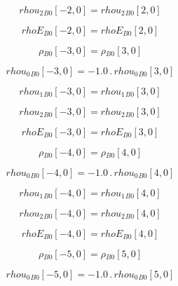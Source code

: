\documentclass{article}
\begin{document}
\begin{dmath}{rhou_{2}{_{B0}}}[{-2,0}] = {rhou_{2}{_{B0}}}[{2,0}]\end{dmath}

\begin{dmath}{rhoE{_{B0}}}[{-2,0}] = {rhoE{_{B0}}}[{2,0}]\end{dmath}

\begin{dmath}{\rho{_{B0}}}[{-3,0}] = {\rho{_{B0}}}[{3,0}]\end{dmath}

\begin{dmath}{rhou_{0}{_{B0}}}[{-3,0}] = - 1.0 \,.\, {rhou_{0}{_{B0}}}[{3,0}]\end{dmath}

\begin{dmath}{rhou_{1}{_{B0}}}[{-3,0}] = {rhou_{1}{_{B0}}}[{3,0}]\end{dmath}

\begin{dmath}{rhou_{2}{_{B0}}}[{-3,0}] = {rhou_{2}{_{B0}}}[{3,0}]\end{dmath}

\begin{dmath}{rhoE{_{B0}}}[{-3,0}] = {rhoE{_{B0}}}[{3,0}]\end{dmath}

\begin{dmath}{\rho{_{B0}}}[{-4,0}] = {\rho{_{B0}}}[{4,0}]\end{dmath}

\begin{dmath}{rhou_{0}{_{B0}}}[{-4,0}] = - 1.0 \,.\, {rhou_{0}{_{B0}}}[{4,0}]\end{dmath}

\begin{dmath}{rhou_{1}{_{B0}}}[{-4,0}] = {rhou_{1}{_{B0}}}[{4,0}]\end{dmath}

\begin{dmath}{rhou_{2}{_{B0}}}[{-4,0}] = {rhou_{2}{_{B0}}}[{4,0}]\end{dmath}

\begin{dmath}{rhoE{_{B0}}}[{-4,0}] = {rhoE{_{B0}}}[{4,0}]\end{dmath}

\begin{dmath}{\rho{_{B0}}}[{-5,0}] = {\rho{_{B0}}}[{5,0}]\end{dmath}

\begin{dmath}{rhou_{0}{_{B0}}}[{-5,0}] = - 1.0 \,.\, {rhou_{0}{_{B0}}}[{5,0}]\end{dmath}
\end{document}
